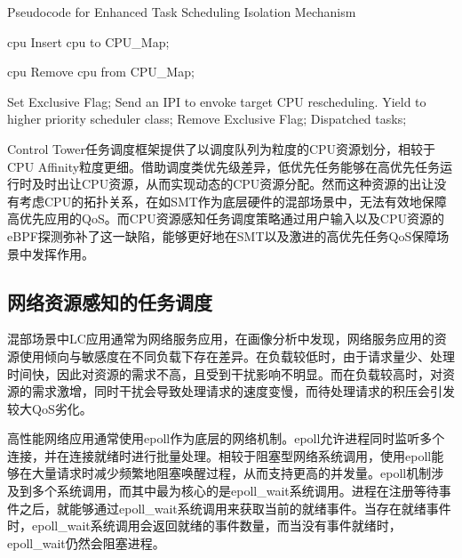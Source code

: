 \begin{algorithm}[H]
    \caption{Pseudocode for Enhanced Task Scheduling Isolation Mechanism}
    \label{alg:cpu_aware_sched}
    \begin{algorithmic}[1]
    
     {cpu}
    \State Insert cpu to CPU\_Map;
    \EndFunction
    
     {cpu}
    \State Remove cpu from CPU\_Map;
    \EndFunction
    
                \State Set Exclusive Flag;
                    \State Send an IPI to envoke target CPU rescheduling.
                \EndFor
                \State Yield to higher priority scheduler class;
            \EndIf
            \State Remove Exclusive Flag;
            \State Dispatched tasks;
        \EndWhile
    \EndFunction
    \end{algorithmic}
\end{algorithm}

Control Tower任务调度框架提供了以调度队列为粒度的CPU资源划分，相较于CPU Affinity粒度更细。借助调度类优先级差异，低优先任务能够在高优先任务运行时及时出让CPU资源，从而实现动态的CPU资源分配。然而这种资源的出让没有考虑CPU的拓扑关系，在如SMT作为底层硬件的混部场景中，无法有效地保障高优先应用的QoS。而CPU资源感知任务调度策略通过用户输入以及CPU资源的eBPF探测弥补了这一缺陷，能够更好地在SMT以及激进的高优先任务QoS保障场景中发挥作用。

\subsection{网络资源感知的任务调度}


混部场景中LC应用通常为网络服务应用，在画像分析中发现，网络服务应用的资源使用倾向与敏感度在不同负载下存在差异。在负载较低时，由于请求量少、处理时间快，因此对资源的需求不高，且受到干扰影响不明显。而在负载较高时，对资源的需求激增，同时干扰会导致处理请求的速度变慢，而待处理请求的积压会引发较大QoS劣化。

高性能网络应用通常使用epoll作为底层的网络机制。epoll允许进程同时监听多个连接，并在连接就绪时进行批量处理。相较于阻塞型网络系统调用，使用epoll能够在大量请求时减少频繁地阻塞唤醒过程，从而支持更高的并发量。epoll机制涉及到多个系统调用，而其中最为核心的是epoll\_wait系统调用。进程在注册等待事件之后，就能够通过epoll\_wait系统调用来获取当前的就绪事件。当存在就绪事件时，epoll\_wait系统调用会返回就绪的事件数量，而当没有事件就绪时，epoll\_wait仍然会阻塞进程。

